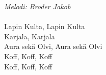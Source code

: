 {\footnotesize\textit{Melodi: Broder Jakob}}\\
\\
Lapin Kulta, Lapin Kulta\\
Karjala, Karjala\\
Aura sekä Olvi, Aura sekä Olvi\\
Koff, Koff, Koff\\
Koff, Koff, Koff\\